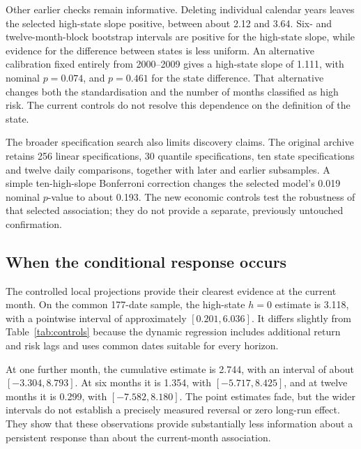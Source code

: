 
Other earlier checks remain informative. Deleting individual calendar years leaves the selected high-state slope positive, between about 2.12 and 3.64. Six- and twelve-month-block bootstrap intervals are positive for the high-state slope, while evidence for the difference between states is less uniform. An alternative calibration fixed entirely from 2000–2009 gives a high-state slope of 1.111, with nominal $p=0.074$, and $p=0.461$ for the state difference. That alternative changes both the standardisation and the number of months classified as high risk. The current controls do not resolve this dependence on the definition of the state.

The broader specification search also limits discovery claims. The original archive retains 256 linear specifications, 30 quantile specifications, ten state specifications and twelve daily comparisons, together with later and earlier subsamples. A simple ten-high-slope Bonferroni correction changes the selected model's 0.019 nominal $p$-value to about 0.193. The new economic controls test the robustness of that selected association; they do not provide a separate, previously untouched confirmation.

\subsection{When the conditional response occurs}

The controlled local projections provide their clearest evidence at the current month. On the common 177-date sample, the high-state $h=0$ estimate is 3.118, with a pointwise interval of approximately $[0.201,6.036]$. It differs slightly from Table~\ref{tab:controls} because the dynamic regression includes additional return and risk lags and uses common dates suitable for every horizon.

At one further month, the cumulative estimate is 2.744, with an interval of about $[-3.304,8.793]$. At six months it is 1.354, with $[-5.717,8.425]$, and at twelve months it is 0.299, with $[-7.582,8.180]$. The point estimates fade, but the wider intervals do not establish a precisely measured reversal or zero long-run effect. They show that these observations provide substantially less information about a persistent response than about the current-month association.

